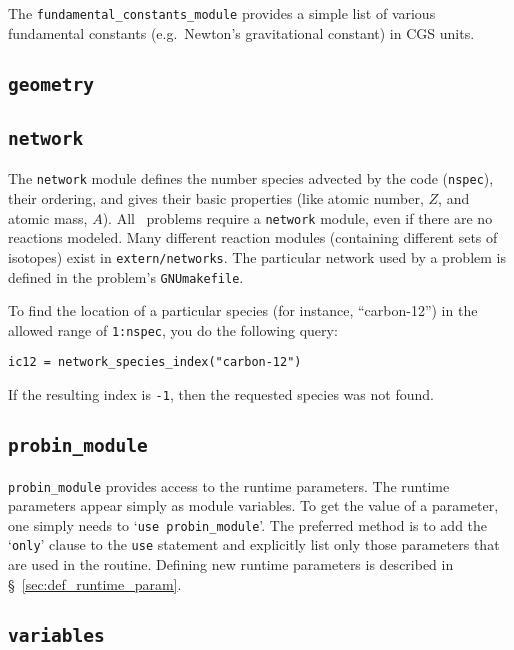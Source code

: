 The {\tt fundamental\_constants\_module} provides a simple list of
various fundamental constants (e.g.\ Newton's gravitational constant)
in CGS units.

\subsection{{\tt geometry}}

\subsection{{\tt network}}

The {\tt network} module defines the number species advected by the
code ({\tt nspec}), their ordering, and gives their basic properties
(like atomic number, $Z$, and atomic mass, $A$).  All \maestro\ problems
require a {\tt network} module, even if there are no reactions
modeled.  Many different reaction modules (containing different sets
of isotopes) exist in {\tt extern/networks}.  The particular network
used by a problem is defined in the problem's {\tt GNUmakefile}.

To find the location of a particular species (for instance, ``carbon-12'')
in the allowed range of {\tt 1:nspec}, you do the following query:
\begin{lstlisting}[language={[95]fortran},mathescape=false]
  ic12 = network_species_index("carbon-12")
\end{lstlisting}
If the resulting index is {\tt -1}, then the requested species was not
found.

\subsection{{\tt probin\_module}}

\label{sec:probin}

{\tt probin\_module} provides access to the runtime parameters.
The runtime parameters appear simply as module variables.  To get the 
value of a parameter, one simply needs to `{\tt use probin\_module}'.
The preferred method is to add the `{\tt only}' clause to the
{\tt use} statement and explicitly list only those parameters that
are used in the routine.  Defining new runtime parameters is
described in \S~\ref{sec:def_runtime_param}.

\subsection{{\tt variables}}

